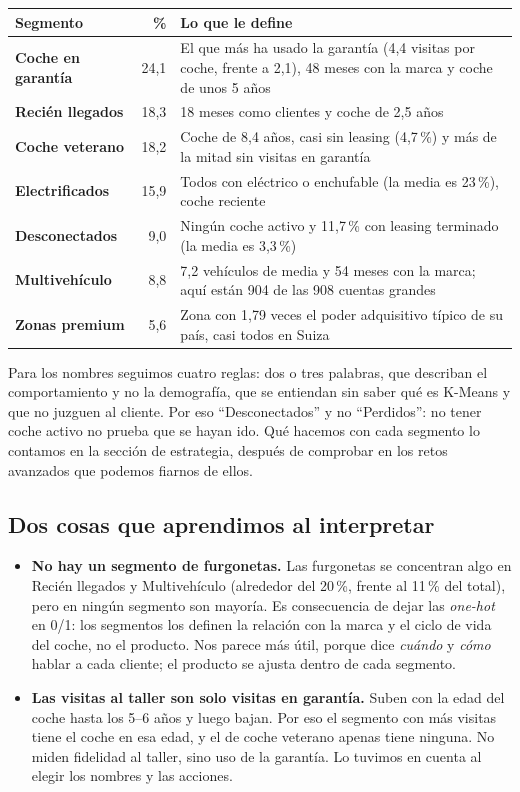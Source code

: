 \documentclass[11pt,a4paper]{article}
\begin{document}
\begin{table}[H]
\centering\small
\begin{tabularx}{\linewidth}{>{\raggedright\arraybackslash}p{3cm}rL}
\toprule
Segmento & \% & Lo que le define \\
\midrule
\textbf{Coche en garantía} & 24,1 & El que más ha usado la garantía (4,4 visitas por coche, frente a 2,1), 48 meses con la marca y coche de unos 5 años \\
\textbf{Recién llegados} & 18,3 & 18 meses como clientes y coche de 2,5 años \\
\textbf{Coche veterano} & 18,2 & Coche de 8,4 años, casi sin leasing (4,7\,\%) y más de la mitad sin visitas en garantía \\
\textbf{Electrificados} & 15,9 & Todos con eléctrico o enchufable (la media es 23\,\%), coche reciente \\
\textbf{Desconectados} & 9,0 & Ningún coche activo y 11,7\,\% con leasing terminado (la media es 3,3\,\%) \\
\textbf{Multivehículo} & 8,8 & 7,2 vehículos de media y 54 meses con la marca; aquí están 904 de las 908 cuentas grandes \\
\textbf{Zonas premium} & 5,6 & Zona con 1,79 veces el poder adquisitivo típico de su país, casi todos en Suiza \\
\bottomrule
\end{tabularx}
\end{table}

Para los nombres seguimos cuatro reglas: dos o tres palabras, que describan el comportamiento y no la demografía, que se entiendan sin saber qué es K-Means y que no juzguen al cliente. Por eso ``Desconectados'' y no ``Perdidos'': no tener coche activo no prueba que se hayan ido. Qué hacemos con cada segmento lo contamos en la sección de estrategia, después de comprobar en los retos avanzados que podemos fiarnos de ellos.

\subsection*{Dos cosas que aprendimos al interpretar}

\begin{itemize}
  \item \textbf{No hay un segmento de furgonetas.} Las furgonetas se concentran algo en Recién llegados y Multivehículo (alrededor del 20\,\%, frente al 11\,\% del total), pero en ningún segmento son mayoría. Es consecuencia de dejar las \textit{one-hot} en 0/1: los segmentos los definen la relación con la marca y el ciclo de vida del coche, no el producto. Nos parece más útil, porque dice \emph{cuándo} y \emph{cómo} hablar a cada cliente; el producto se ajusta dentro de cada segmento.
  \item \textbf{Las visitas al taller son solo visitas en garantía.} Suben con la edad del coche hasta los 5--6 años y luego bajan. Por eso el segmento con más visitas tiene el coche en esa edad, y el de coche veterano apenas tiene ninguna. No miden fidelidad al taller, sino uso de la garantía. Lo tuvimos en cuenta al elegir los nombres y las acciones.
\end{itemize}
\end{document}
